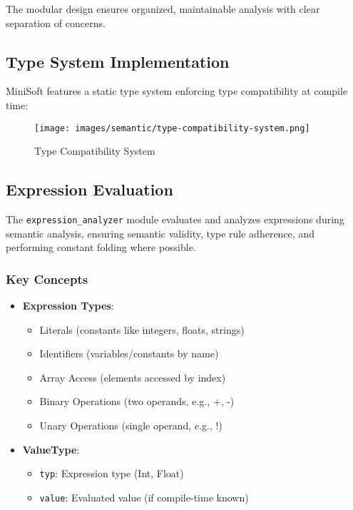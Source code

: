 \documentclass[12pt,a4paper]{article}
\begin{document}
The modular design ensures organized, maintainable analysis with clear separation of concerns.

\subsection{Type System Implementation}
MiniSoft features a static type system enforcing type compatibility at compile time:


\begin{figure}[H]
	\centering
	\texttt{[image: images/semantic/type-compatibility-system.png]}
	\caption{Type Compatibility System}
\end{figure}

\subsection{Expression Evaluation}
The \texttt{expression\_analyzer} module evaluates and analyzes expressions during semantic analysis, ensuring semantic validity, type rule adherence, and performing constant folding where possible.

\subsubsection*{Key Concepts}
\begin{itemize}
	\item \textbf{Expression Types}:
	      \begin{itemize}
		      \item Literals (constants like integers, floats, strings)
		      \item Identifiers (variables/constants by name)
		      \item Array Access (elements accessed by index)
		      \item Binary Operations (two operands, e.g., +, -)
		      \item Unary Operations (single operand, e.g., !)
	      \end{itemize}

	\item \textbf{ValueType}:
	      \begin{itemize}
		      \item \texttt{typ}: Expression type (Int, Float)
		      \item \texttt{value}: Evaluated value (if compile-time known)
	      \end{itemize}
\end{itemize}
\end{document}
